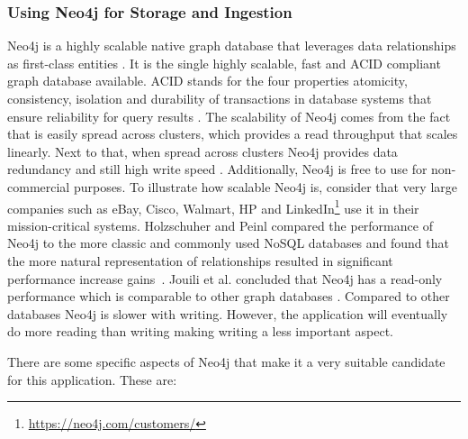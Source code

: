 \subsubsection{Using Neo4j for Storage and Ingestion}
Neo4j is a highly scalable native graph database that leverages data relationships as first-class entities \cite{neo4j}. It is the single highly scalable, fast and ACID compliant graph database available. ACID stands for the four properties atomicity, consistency, isolation and durability of transactions in database systems that ensure reliability for query results \cite{haerder1983principles}. The scalability of Neo4j comes from the fact that is easily spread across clusters, which provides a read throughput that scales linearly. Next to that, when spread across clusters Neo4j provides data redundancy and still high write speed \cite{neo4jscalable}. Additionally, Neo4j is free to use for non-commercial purposes. To illustrate how scalable Neo4j is, consider that very large companies such as eBay, Cisco, Walmart, HP and LinkedIn\footnote{\url{https://neo4j.com/customers/}} use it in their mission-critical systems. Holzschuher and Peinl compared the performance of Neo4j to the more classic and commonly used NoSQL databases and found that the more natural representation of relationships resulted in significant performance increase gains~\cite{holzschuher2013performance}. Jouili et al. concluded that Neo4j has a read-only performance which is comparable to other graph databases \cite{jouili2013}. Compared to other databases Neo4j is slower with writing. However, the application will eventually do more reading than writing making writing a less important aspect.

There are some specific aspects of Neo4j that make it a very suitable candidate for this application. These are:

